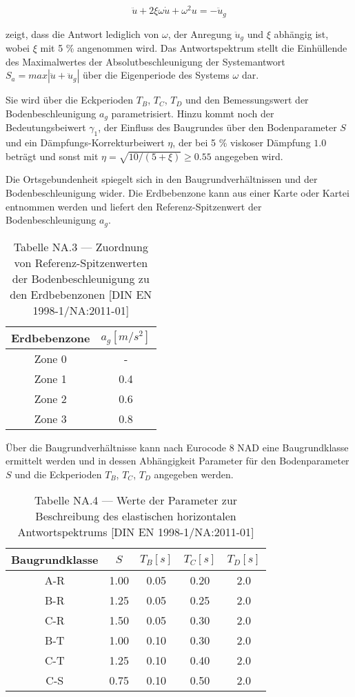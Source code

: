 \begin{equation} \label{ems_aws_umf}
\ddot u + 2\xi\omega \dot u + \omega^2 u = - \ddot u_g
\end{equation}

zeigt, dass die Antwort lediglich von $\omega$, der Anregung $\ddot u_g$ und $\xi$ abhängig ist, wobei $\xi$ mit 5 \% angenommen wird.
Das Antwortspektrum stellt die Einhüllende des Maximalwertes der Absolutbeschleunigung der Systemantwort $S_a=max|\ddot u + \ddot u_g|$ über die Eigenperiode des Systems $\omega$ dar. \cite{Bachmann}

Sie wird über die Eckperioden $T_B$, $T_C$, $T_D$ und den Bemessungswert der Bodenbeschleunigung $a_g$ parametrisiert. Hinzu kommt noch der Bedeutungsbeiwert $\gamma_1$, der Einfluss des Baugrundes über den Bodenparameter $S$ und ein Dämpfungs-Korrekturbeiwert $\eta$, der bei 5 \% viskoser Dämpfung $1.0$ beträgt und sonst mit $\eta=\sqrt{10/(5+\xi)}\geq 0.55$ angegeben wird.

\pagebreak

Die Ortsgebundenheit spiegelt sich in den Baugrundverhältnissen und der Bodenbeschleunigung wider. Die Erdbebenzone kann aus einer Karte oder Kartei entnommen werden und liefert den Referenz-Spitzenwert der Bodenbeschleunigung $a_g$.

\begin{table}[H]
\centering
\begin{tabular}{ |c|c| } 
 \hline
 Erdbebenzone & $a_g [m/s^2]$ \\
 \hline\hline
 Zone 0 & - \\ 
 Zone 1 & 0.4 \\ 
 Zone 2 & 0.6 \\ 
 Zone 3 & 0.8 \\ 
 \hline
\end{tabular}
\caption{Tabelle NA.3 — Zuordnung von Referenz-Spitzenwerten der Bodenbeschleunigung zu den Erdbebenzonen [DIN EN 1998-1/NA:2011-01]}
\end{table}

Über die Baugrundverhältnisse kann nach Eurocode 8 NAD eine Baugrundklasse ermittelt werden und in dessen Abhängigkeit Parameter für den Bodenparameter $S$ und die Eckperioden $T_B$, $T_C$, $T_D$ angegeben werden.

\begin{table}[H]
\centering
\begin{tabular}{ |c|c|c|c|c| } 
 \hline
 Baugrundklasse & $S$ & $T_B [s]$ & $T_C [s]$ & $T_D [s]$\\
 \hline\hline
 A-R  & 1.00 & 0.05 & 0.20 & 2.0\\ 
 B-R  & 1.25 & 0.05 & 0.25 & 2.0\\ 
 C-R  & 1.50 & 0.05 & 0.30 & 2.0\\ 
 \hline
 B-T  & 1.00 & 0.10 & 0.30 & 2.0\\
 C-T  & 1.25 & 0.10 & 0.40 & 2.0\\
 \hline
 C-S  & 0.75 & 0.10 & 0.50 & 2.0\\
 \hline
\end{tabular}
\caption{Tabelle NA.4 — Werte der Parameter zur Beschreibung des elastischen horizontalen Antwortspektrums [DIN EN 1998-1/NA:2011-01]}
\end{table}

